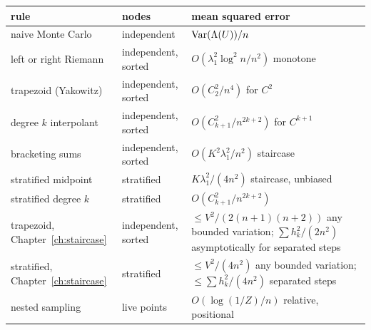 \begin{center}
\small
\begin{tabular}{p{1.35in}p{0.85in}p{1.8in}}
\toprule
rule & nodes & mean squared error \\
\midrule
naive Monte Carlo & independent & $\operatorname{Var}(\Lambda(U)) / n$ \\
left or right Riemann & independent, sorted & $O(\lambda_1^2 \log^2 n / n^2)$ monotone \\
trapezoid (Yakowitz) & independent, sorted & $O(C_2^2 / n^4)$ for $C^2$ \\
degree $k$ interpolant & independent, sorted & $O(C_{k+1}^2 / n^{2k+2})$ for $C^{k+1}$ \\
bracketing sums & independent, sorted & $O(K^2 \lambda_1^2 / n^2)$ staircase \\
stratified midpoint & stratified & $K \lambda_1^2 / (4 n^2)$ staircase, unbiased \\
stratified degree $k$ & stratified & $O(C_{k+1}^2 / n^{2k+2})$ \\
trapezoid, Chapter~\ref{ch:staircase} & independent, sorted & $\le V^2 / (2(n+1)(n+2))$ any bounded variation; $\sum h_k^2 / (2n^2)$ asymptotically for separated steps \\
stratified, Chapter~\ref{ch:staircase} & stratified & $\le V^2 / (4 n^2)$ any bounded variation; $\le \sum h_k^2 / (4 n^2)$ separated steps \\
nested sampling & live points & $O(\log(1/Z) / n)$ relative, positional \\
\bottomrule
\end{tabular}
\end{center}
